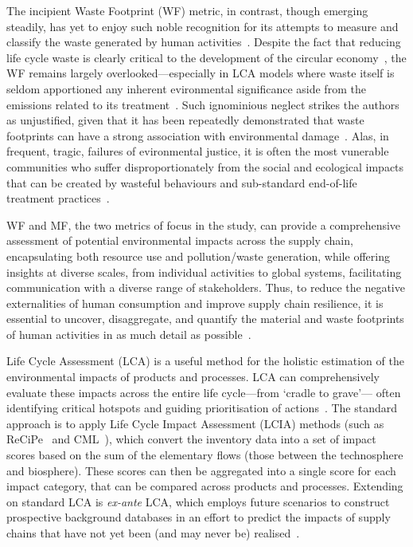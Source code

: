 The incipient Waste Footprint (WF) metric, in contrast, though emerging steadily, has yet to enjoy such noble recognition for its attempts to measure and classify the waste generated by human activities~\citep{laurenti2016wastefootprint}. Despite the fact that reducing life cycle waste is clearly critical to the development of the circular economy~\cite{towa2020wastefootprint,ellenmacarthur2015ce}, the WF remains largely overlooked---especially in LCA models where waste itself is seldom apportioned any inherent evironmental significance aside from the emissions related to its treatment~\citep{laurenti2023wastefootprint}.
Such ignominious neglect strikes the authors as unjustified, given that it has been repeatedly demonstrated that waste footprints can have a strong association with environmental damage~\citep{laurenti2023wastefootprint,doka2024publications, ridoutt2010wasteimpacts,jaio2013wasteabsorbtionfootprint}. Alas, in frequent, tragic, failures of evironmental justice, it is often the most vunerable communities who suffer disproportionately from the social and ecological impacts that can be created by wasteful behaviours and sub-standard end-of-life treatment practices~\citep{pellow2023envjusticewaste,akese2018envjustice}.

WF and MF, the two metrics of focus in the study, can provide a comprehensive assessment of potential environmental impacts across the supply chain, encapsulating both resource use and pollution/waste generation, while offering insights at diverse scales, from individual activities to global systems, facilitating communication with a diverse range of stakeholders. Thus, to reduce the negative externalities of human consumption and improve supply chain resilience, it is essential to uncover, disaggregate, and quantify the material and waste footprints of human activities in as much detail as possible~\citep{bisinella2024wastelca, towa2020wastefootprint}.




Life Cycle Assessment (LCA) is a useful method for the holistic estimation of the environmental impacts of products and processes. LCA can comprehensively evaluate these impacts across the entire life cycle---from `cradle to grave'--- often identifying critical hotspots and guiding prioritisation of actions~\citep{guinee2011lca}. The standard approach is to apply Life Cycle Impact Assessment (LCIA) methods (such as ReCiPe~\citep{huijbregts2016recipe} and CML~\citep{guinee2002cml}), which convert the inventory data into a set of impact scores based on the sum of the elementary flows (those between the technosphere and biosphere). These scores can then be aggregated into a single score for each impact category, that can be compared across products and processes. Extending on standard LCA is \textit{ex-ante} LCA, which employs future scenarios to construct prospective background databases in an effort to predict the impacts of supply chains that have not yet been (and may never be) realised~\citep{cucurachi2018exante,blanco2020exante}.

